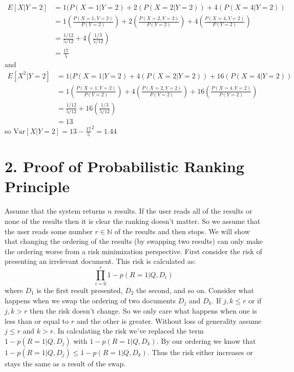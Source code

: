 \documentclass[paper=a4, fontsize=11pt]{jhwhw} %
\begin{document}
\begin{enumerate}
\begin{align*}
            E[X|Y = 2] &= 1(P(X = 1|Y = 2) + 2(P(X = 2| Y = 2)) + 4(P(X = 4|Y = 2))\\
                       &= 1(\frac{P(X = 1, Y = 2)}{P(Y = 2)}) + 2(\frac{P(X = 2, Y = 2)}{P(Y = 2)}) + 4(\frac{P(X = 4, Y = 2)}{P(Y = 2)})\\
                       &= \frac{1/12}{5/12} + 4(\frac{1/3}{5/12})\\
                       &= \frac{17}{5}
        \end{align*}
        and
        \begin{align*}
            E[X^2|Y = 2] &= 1(P(X = 1|Y = 2) + 4(P(X = 2| Y = 2)) + 16(P(X = 4|Y = 2))\\
                       &= 1(\frac{P(X = 1, Y = 2)}{P(Y = 2)}) + 4(\frac{P(X = 2, Y = 2)}{P(Y = 2)}) + 16(\frac{P(X = 4, Y = 2)}{P(Y = 2)})\\
                       &= \frac{1/12}{5/12} + 16(\frac{1/3}{5/12})\\
                       &= 13
        \end{align*}
        so $\mathrm{Var}[X|Y = 2] = 13 - \frac{17}{5}^2 = 1.44$
\end{enumerate}
\solution
\section*{2. Proof of Probabilistic Ranking Principle}
\solution
Assume that the system returns $n$ results. If the user reads all of the results or none of the results then it is clear the ranking doesn't matter. So we assume that the user reads some number $r\in \mathbb N$ of the results and then stops. We will show that changing the ordering of the results (by swapping two results) can only make the ordering worse from a risk minimization perspective. First consider the risk of presenting an irrelevant document. This risk is calculated as:
$$\prod_{i=0}^{r} 1 - p(R = 1|Q, D_i)$$
where $D_1$ is the first result presented, $D_2$ the second, and so on. Consider what happens when we swap the ordering of two documents $D_j$ and $D_k$. If $j, k \le r$ or if $j, k > r$ then the risk doesn't change. So we only care what happens when one is less than or equal to $r$ and the other is greater. Without loss of generality assume $j \le r$ and $k > r$. In calculating the risk we've replaced the term $1 - p(R = 1|Q, D_j)$ with $1 - p(R = 1| Q, D_k)$. By our ordering we know that $1 - p(R = 1|Q, D_j) \le 1 - p(R = 1|Q, D_k)$. Thus the risk either increases or stays the same as a result of the swap.
\end{document}
